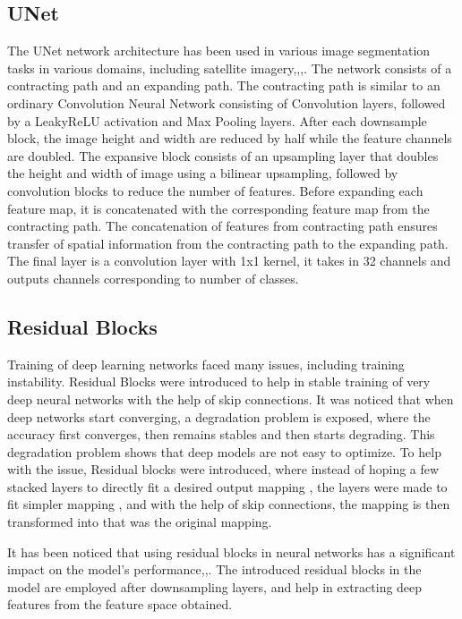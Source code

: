 \documentclass[review]{elsarticle}
\begin{document}
\subsection{UNet}
The UNet\cite{DBLP:journals/corr/RonnebergerFB15} network architecture has been used in various image segmentation tasks in various domains, including satellite imagery\cite{9760787},\cite{9426212},\cite{Chaudhary2022},\cite{Larionov2020}. The network consists of a contracting path and an expanding path. The contracting path is similar to an ordinary Convolution Neural Network consisting of Convolution layers, followed by a LeakyReLU activation and Max Pooling layers. After each downsample block, the image height and width are reduced by half while the feature channels are doubled. The expansive block consists of an upsampling layer that doubles the height and width of image using a bilinear upsampling, followed by convolution blocks to reduce the number of features. Before expanding each feature map, it is concatenated with the corresponding feature map from the contracting path. The concatenation of features from contracting path ensures transfer of spatial information from the contracting path to the expanding path. The final layer is a convolution layer with 1x1 kernel, it takes in 32 channels and outputs channels corresponding to number of classes.

\subsection{Residual Blocks}
Training of deep learning networks faced many issues, including training instability. Residual Blocks\cite{DBLP:journals/corr/HeZRS15} were introduced to help in stable training of very deep neural networks with the help of skip connections. It was noticed that when deep networks start converging, a degradation problem is exposed, where the accuracy first converges, then remains stables and then starts degrading. This degradation problem shows that deep models are not easy to optimize. To help with the issue, Residual blocks were introduced, where instead of hoping a few stacked layers to directly fit a desired output mapping , the layers were made to fit simpler mapping , and with the help of skip connections, the mapping is then transformed into  that was the original mapping. 

It has been noticed that using residual blocks in neural networks has a significant impact on the model's performance\cite{2019RoadTE},\cite{Wu2021HrlinknetLW},\cite{Sanya2019EXPLOITINGSC}. The introduced residual blocks in the model are employed after downsampling layers, and help in extracting deep features from the feature space obtained.
\end{document}
